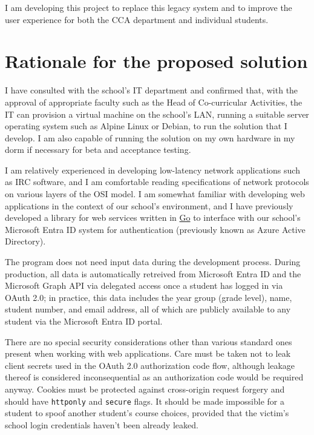 I am developing this project to replace this legacy system and to improve the
user experience for both the CCA department and individual students.

\section{Rationale for the proposed solution}

I have consulted with the school's IT department and confirmed that, with the
approval of appropriate faculty such as the Head of Co-curricular Activities,
the IT can provision a virtual machine on the school's LAN, running a suitable
server operating system such as Alpine Linux or Debian, to run the solution
that I develop. I am also capable of running the solution on my own hardware in
my dorm if necessary for beta and acceptance testing.

I am relatively experienced in developing low-latency network applications such
as IRC software, and I am comfortable reading specifications of network
protocols on various layers of the OSI model. I am somewhat familiar with
developing web applications in the context of our school's environment, and I
have previously developed a library for web services written in
\href{https://go.dev}{Go} to interface with our school's Microsoft Entra ID
system for authentication (previously known as Azure Active Directory).

The program does not need input data during the development process. During
production, all data is automatically retreived from Microsoft Entra ID and the
Microsoft Graph API via delegated access once a student has logged in via OAuth
2.0; in practice, this data includes the year group (grade level), name,
student number, and email address, all of which are publicly available to any
student via the Microsoft Entra ID portal.

There are no special security considerations other than various standard ones
present when working with web applications. Care must be taken not to leak
client secrets used in the OAuth 2.0 authorization code flow, although leakage
thereof is considered inconsequential as an authorization code would be
required anyway. Cookies must be protected against cross-origin request forgery
and should have \texttt{httponly} and \texttt{secure} flags. It should be made
impossible for a student to spoof another student's course choices, provided
that the victim's school login credentials haven't been already leaked.


